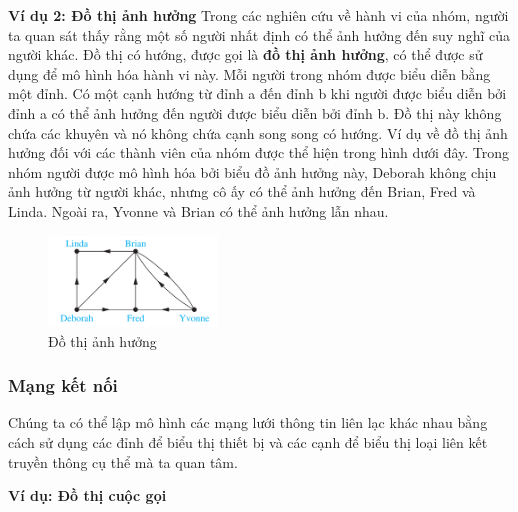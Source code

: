 \textbf{Ví dụ 2: Đồ thị ảnh hưởng}
Trong các nghiên cứu về hành vi của nhóm, người ta quan sát thấy rằng một số người nhất định có thể ảnh hưởng đến suy nghĩ của người khác. Đồ thị có hướng, được gọi là \textbf{đồ thị ảnh hưởng}, có thể được sử dụng để mô hình hóa hành vi này. Mỗi người trong nhóm được biểu diễn bằng một đỉnh. Có một cạnh hướng từ đỉnh a đến đỉnh b khi người được biểu diễn bởi đỉnh a có thể ảnh hưởng đến người được biểu diễn bởi đỉnh b. Đồ thị này không chứa các khuyên và nó không chứa cạnh song song có hướng. Ví dụ về đồ thị ảnh hưởng đối với các thành viên của nhóm được thể hiện trong hình dưới đây. Trong nhóm người được mô hình hóa bởi biểu đồ ảnh hưởng này, Deborah không chịu ảnh hưởng từ người khác, nhưng cô ấy có thể ảnh hưởng đến Brian, Fred và Linda. Ngoài ra, Yvonne và Brian có thể ảnh hưởng lẫn nhau.

\begin{figure}[H] %
    \centering %
    \includegraphics[width=0.4\textwidth]{assets/pic7.png} 
    \caption{Đồ thị ảnh hưởng} %
\end{figure}


\subsubsection{Mạng kết nối}
Chúng ta có thể lập mô hình các mạng lưới thông tin liên lạc khác nhau bằng cách sử dụng các đỉnh để biểu thị thiết bị và các cạnh để biểu thị loại liên kết truyền thông cụ thể mà ta quan tâm.

\textbf{Ví dụ: Đồ thị cuộc gọi}

